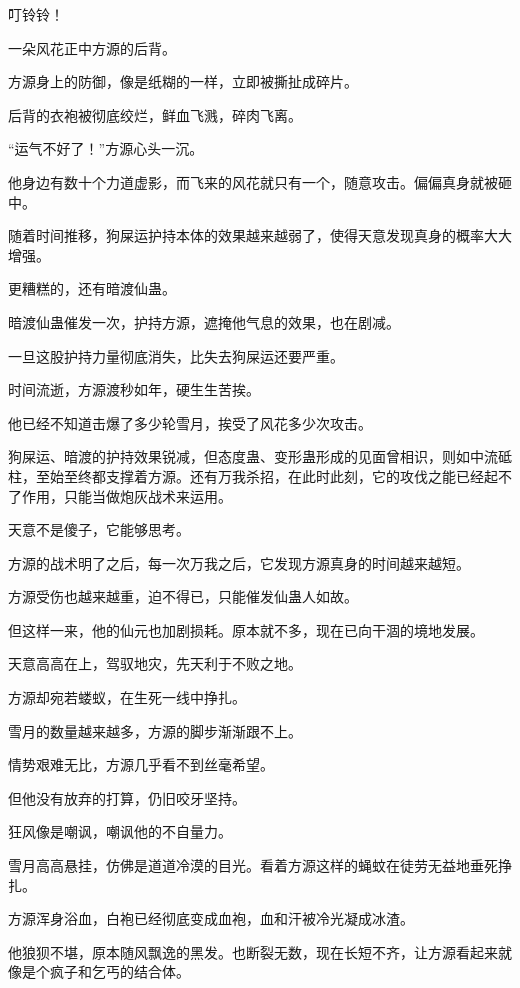 
\begin{this_body}

叮铃铃！

一朵风花正中方源的后背。

方源身上的防御，像是纸糊的一样，立即被撕扯成碎片。

后背的衣袍被彻底绞烂，鲜血飞溅，碎肉飞离。

“运气不好了！”方源心头一沉。

他身边有数十个力道虚影，而飞来的风花就只有一个，随意攻击。偏偏真身就被砸中。

随着时间推移，狗屎运护持本体的效果越来越弱了，使得天意发现真身的概率大大增强。

更糟糕的，还有暗渡仙蛊。

暗渡仙蛊催发一次，护持方源，遮掩他气息的效果，也在剧减。

一旦这股护持力量彻底消失，比失去狗屎运还要严重。

时间流逝，方源渡秒如年，硬生生苦挨。

他已经不知道击爆了多少轮雪月，挨受了风花多少次攻击。

狗屎运、暗渡的护持效果锐减，但态度蛊、变形蛊形成的见面曾相识，则如中流砥柱，至始至终都支撑着方源。还有万我杀招，在此时此刻，它的攻伐之能已经起不了作用，只能当做炮灰战术来运用。

天意不是傻子，它能够思考。

方源的战术明了之后，每一次万我之后，它发现方源真身的时间越来越短。

方源受伤也越来越重，迫不得已，只能催发仙蛊人如故。

但这样一来，他的仙元也加剧损耗。原本就不多，现在已向干涸的境地发展。

天意高高在上，驾驭地灾，先天利于不败之地。

方源却宛若蝼蚁，在生死一线中挣扎。

雪月的数量越来越多，方源的脚步渐渐跟不上。

情势艰难无比，方源几乎看不到丝毫希望。

但他没有放弃的打算，仍旧咬牙坚持。

狂风像是嘲讽，嘲讽他的不自量力。

雪月高高悬挂，仿佛是道道冷漠的目光。看着方源这样的蝇蚊在徒劳无益地垂死挣扎。

方源浑身浴血，白袍已经彻底变成血袍，血和汗被冷光凝成冰渣。

他狼狈不堪，原本随风飘逸的黑发。也断裂无数，现在长短不齐，让方源看起来就像是个疯子和乞丐的结合体。


\end{this_body}
